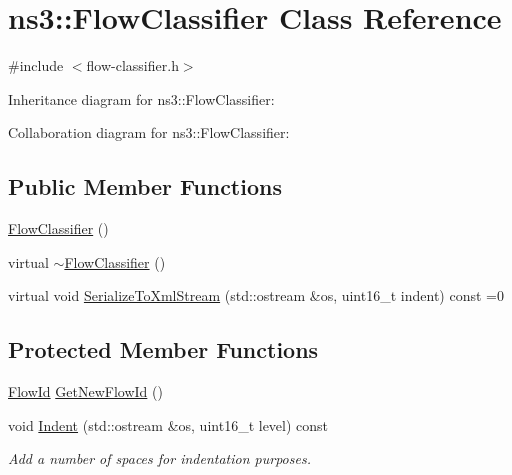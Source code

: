 \hypertarget{classns3_1_1FlowClassifier}{}\section{ns3\+:\+:Flow\+Classifier Class Reference}
\label{classns3_1_1FlowClassifier}


{\ttfamily \#include $<$flow-\/classifier.\+h$>$}



Inheritance diagram for ns3\+:\+:Flow\+Classifier\+:


Collaboration diagram for ns3\+:\+:Flow\+Classifier\+:
\subsection*{Public Member Functions}
\begin{DoxyCompactItemize}
\item 
\hyperlink{classns3_1_1FlowClassifier_a371675a1a2d2e4089c18f39906edcff9}{Flow\+Classifier} ()
\item 
virtual \hyperlink{classns3_1_1FlowClassifier_a347e4ec46e352c8d061fd53e4fae2f3d}{$\sim$\+Flow\+Classifier} ()
\item 
virtual void \hyperlink{classns3_1_1FlowClassifier_aeb06e447fa079fcedc7c9745c23958b3}{Serialize\+To\+Xml\+Stream} (std\+::ostream \&os, uint16\+\_\+t indent) const =0
\end{DoxyCompactItemize}
\subsection*{Protected Member Functions}
\begin{DoxyCompactItemize}
\item 
\hyperlink{group__flow-monitor_ga39a766c4a370cdb9ab8ac85da4b288e9}{Flow\+Id} \hyperlink{classns3_1_1FlowClassifier_a5469e94282efde8b8212e20995c6cccd}{Get\+New\+Flow\+Id} ()
\item 
void \hyperlink{classns3_1_1FlowClassifier_adc5d8694d3c9059b5ac2c664e5897088}{Indent} (std\+::ostream \&os, uint16\+\_\+t level) const 
\begin{DoxyCompactList}\small\item\em Add a number of spaces for indentation purposes. \end{DoxyCompactList}\end{DoxyCompactItemize}
